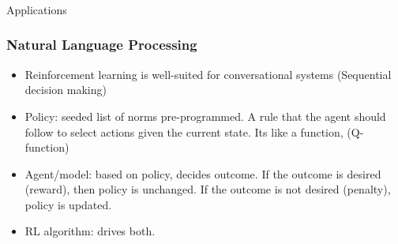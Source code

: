 \begin{frame}[fragile]\frametitle{}
\begin{center}
{\Large Applications}
\end{center}
\end{frame}


\begin{frame}[fragile]\frametitle{Natural Language Processing}


\begin{itemize}
\item Reinforcement learning is well-suited for conversational systems (Sequential decision making)
\item Policy: seeded list of norms pre-programmed. A rule that the agent should follow to select actions given the current state. Its like a function, (Q-function)
\item Agent/model: based on policy, decides outcome. If the outcome is desired (reward), then policy is unchanged. If the outcome is not desired (penalty), policy is updated.
\item RL algorithm: drives both.
\end{itemize}

\end{frame}